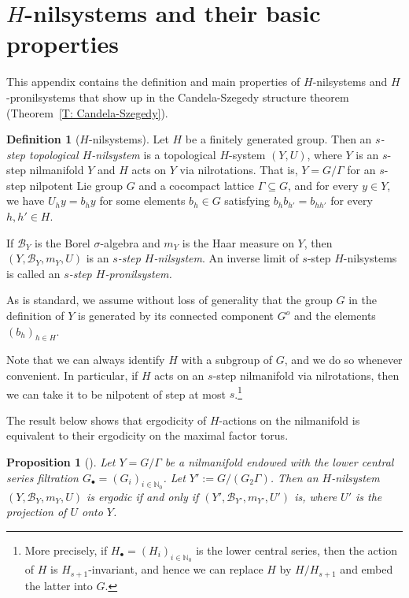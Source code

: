\documentclass[11pt]{amsart}
\newtheorem{proposition}[lemma]{Proposition}
\theoremstyle{definition}
\newtheorem{definition}[lemma]{Definition}
\newcommand{\N}{{\mathbb N}}
\newcommand{\CB}{{\mathcal B}}
\newcommand{\1}{{\mathbf{1}}}
\begin{document}
\section{$H$-nilsystems and their basic properties}\label{A: nilsystems}
This appendix contains the definition and main properties of $H$-nilsystems and $H$-pronilsystems that show up in the Candela-Szegedy structure theorem (Theorem~\ref{T: Candela-Szegedy}).
\begin{definition}[$H$-nilsystems]\label{D: nilsystems}
    Let $H$ be a finitely generated group. Then an \textit{$s$-step topological $H$-nilsystem} is a topological $H$-system $(Y, U)$, where $Y$ is an $s$-step nilmanifold $Y$ and
    $H$ acts on $Y$ via nilrotations. That is, $Y=G/\Gamma$ for an $s$-step nilpotent Lie group $G$ and a cocompact lattice $\Gamma\subseteq G$, and for every $y\in Y$, we have $U_h y = b_h y$ for some elements $b_h\in G$ satisfying $b_hb_{h'} = b_{hh'}$ for every $h,h'\in H$.
    
    If $\CB_Y$ is the Borel $\sigma$-algebra and $m_Y$ is the Haar measure on $Y$, then $(Y, \CB_Y, m_Y, U)$ is an \textit{$s$-step $H$-nilsystem}. An inverse limit of $s$-step $H$-nilsystems is called an \textit{$s$-step $H$-pronilsystem.}
\end{definition}
As is standard, we assume without loss of generality that %
the group $G$ in the definition of $Y$ is generated by its connected component $G^o$ and the elements $(b_h)_{h\in H}$.

Note that 
we can always identify $H$ with a subgroup of $G$, and we do so whenever convenient. In particular, if $H$ acts on an $s$-step nilmanifold via nilrotations, then we can take it to be nilpotent of step at most $s$.\footnote{More precisely, if $H_\bullet = (H_i)_{i\in\N_0}$ is the lower central series, then the action of $H$ is $H_{s+1}$-invariant, and hence we can replace $H$ by $H/H_{s+1}$ and embed the latter into $G$.} %



The result below shows that ergodicity of $H$-actions on the nilmanifold is equivalent to their ergodicity on the maximal factor torus. 

\begin{proposition}[{\cite[Theorem~2.17]{L05b}}]\label{P: ergodicity of nilsystems}
    Let $Y = G/\Gamma$ be a nilmanifold endowed with the lower central series filtration $G_\bullet=(G_i)_{i\in\N_0}$. Let $Y':=G/(G_{2}\Gamma)$. 
    Then an $H$-nilsystem $(Y, \CB_Y, m_Y, U)$ is ergodic if and only if $(Y', \CB_{Y'}, m_{Y'}, U')$ is, where $U'$ is the projection of $U$ onto $Y$.
\end{proposition}
\end{document}
